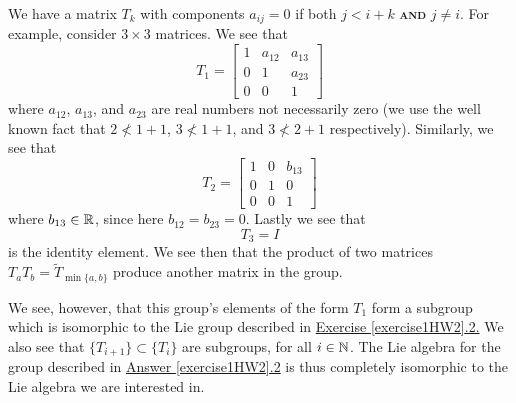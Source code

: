 \medbreak
{}
We have a matrix $T_{k}$ with components $a_{ij}=0$ if both $j<i+k$
\textsc{\textbf{and}} $j\not=i$. For example, consider $3\times3$
matrices. We see that
\begin{equation}
T_{1}=\begin{bmatrix}
1 & a_{12} & a_{13}\\
0 & 1 & a_{23}\\
0 & 0 & 1
\end{bmatrix}
\end{equation}
where $a_{12}$, $a_{13}$, and $a_{23}$ are real numbers not
necessarily zero (we use the well known fact that $2\not<1+1$,
$3\not<1+1$, and $3\not<2+1$ respectively). Similarly, we see
that
\begin{equation}
T_{2}=\begin{bmatrix}
1 & 0 & b_{13}\\
0 & 1 & 0\\
0 & 0 & 1
\end{bmatrix}
\end{equation}
where $b_{13}\in\Bbb{R}$, since here $b_{12}=b_{23}=0$. Lastly we
see that
\begin{equation}
T_{3}=I
\end{equation}
is the identity element. We see then that the product of two
matrices $T_{a}T_{b}=\widetilde{T}_{\min\{a,b\}}$ produce another
matrix in the group.

We see, however, that this group's elements of the form $T_{1}$
form a subgroup which is isomorphic to the Lie group
described in \hyperref[exercise1HW2]{Exercise \ref{exercise1HW2}.2.}
We also see that $\{T_{i+1}\}\subset\{T_{i}\}$ are subgroups, for
all $i\in\Bbb{N}$. The Lie algebra for the group described in \hyperref[exercise1HW2]{Answer \ref{exercise1HW2}.2} is thus completely
isomorphic to the Lie algebra we are interested in. 

